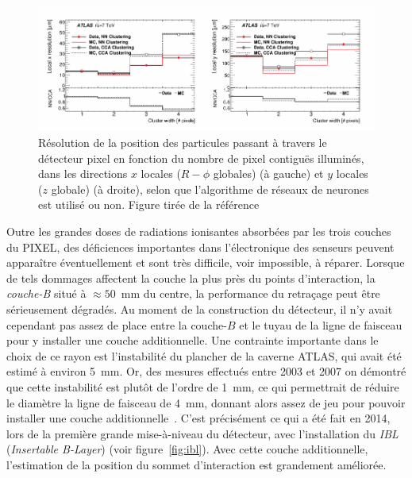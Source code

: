 \begin{figure}
  \centering
  \includegraphics{pixel_acc.pdf}
  \caption{Résolution de la position des particules passant à travers
    le détecteur pixel en fonction du nombre de pixel contiguës
    illuminés, dans les directions $x$ locales ($R-\phi$ globales) (à
    gauche) et $y$ locales ($z$ globale) (à droite), selon que
    l'algorithme de réseaux de neurones est utilisé ou non. Figure
    tirée de la référence~\cite{collaboration_neural_2014}}
  \label{fig:pixel_acc}
\end{figure}

Outre les grandes doses de radiations ionisantes absorbées par les
trois couches du PIXEL, des déficiences importantes dans
l'électronique des senseurs peuvent apparaître éventuellement et sont
très difficile, voir impossible, à réparer. Lorsque de tels dommages
affectent la couche la plus près du points d'interaction, la
\emph{couche-B} situé à $\approx 50$~mm du centre, la performance du
retraçage peut être sérieusement dégradés. Au moment de la
construction du détecteur, il n'y avait cependant pas assez de place
entre la couche-$B$ et le tuyau de la ligne de faisceau pour y
installer une couche additionnelle. Une contrainte importante
dans le choix de ce rayon est l'instabilité du plancher de la caverne
ATLAS, qui avait été estimé à environ 5~mm. Or, des mesures effectués
entre 2003 et 2007 on démontré que cette instabilité est plutôt de
l'ordre de 1~mm, ce qui permettrait de réduire le diam\`etre la ligne de faisceau de
4~mm, donnant alors assez de jeu pour pouvoir installer une couche
additionnelle~\cite{capeans_atlas_2010}. C'est précisément ce qui a été
fait en 2014, lors de la première grande mise-à-niveau du détecteur,
avec l'installation du \emph{IBL} (\emph{Insertable B-Layer}) (voir
figure~\ref{fig:ibl}). Avec cette couche additionnelle, l'estimation de
la position du sommet d'interaction est grandement améliorée.

